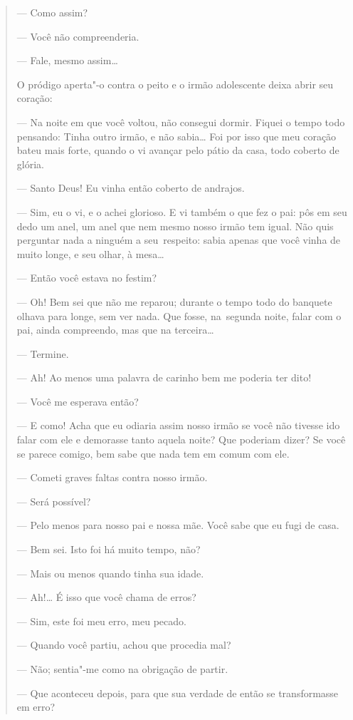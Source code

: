 \begin{quote}
--- Como assim?

--- Você não compreenderia.

--- Fale, mesmo assim\ldots{}

O pródigo aperta"-o contra o peito e o irmão adolescente deixa abrir seu
coração:

--- Na noite em que você voltou, não consegui dormir. Fiquei o tempo todo
pensando: Tinha outro irmão, e não sabia\ldots{} Foi por isso que meu
coração bateu mais forte, quando o vi avançar pelo pátio da casa, todo
coberto de glória.

--- Santo Deus! Eu vinha então coberto de andrajos.

--- Sim, eu o vi, e o achei glorioso. E vi também o que fez o pai: pôs em
seu dedo um anel, um anel que nem mesmo nosso irmão tem igual. Não quis
perguntar nada a ninguém a seu~respeito: sabia apenas que você vinha de
muito longe, e seu olhar, à mesa\ldots{}

--- Então você estava no festim?

--- Oh! Bem sei que não me reparou; durante o tempo todo do banquete
olhava para longe, sem ver nada. Que fosse, na~segunda noite, falar com
o pai, ainda compreendo, mas que na terceira\ldots{}

--- Termine.

--- Ah! Ao menos uma palavra de carinho bem me poderia ter dito!

--- Você me esperava então?

--- E como! Acha que eu odiaria assim nosso irmão se você não tivesse ido
falar com ele e demorasse tanto aquela noite? Que poderiam dizer? Se
você se parece comigo, bem sabe que nada tem em comum com ele.

--- Cometi graves faltas contra nosso irmão.

--- Será possível?

--- Pelo menos para nosso pai e nossa mãe. Você sabe que eu fugi de casa.

--- Bem sei. Isto foi há muito tempo, não?

--- Mais ou menos quando tinha sua idade.

--- Ah!\ldots{} É isso que você chama de erros?

--- Sim, este foi meu erro, meu pecado.

--- Quando você partiu, achou que procedia mal?

--- Não; sentia"-me como na obrigação de partir.

--- Que aconteceu depois, para que sua verdade de então se transformasse
em erro?


\end{quote}
